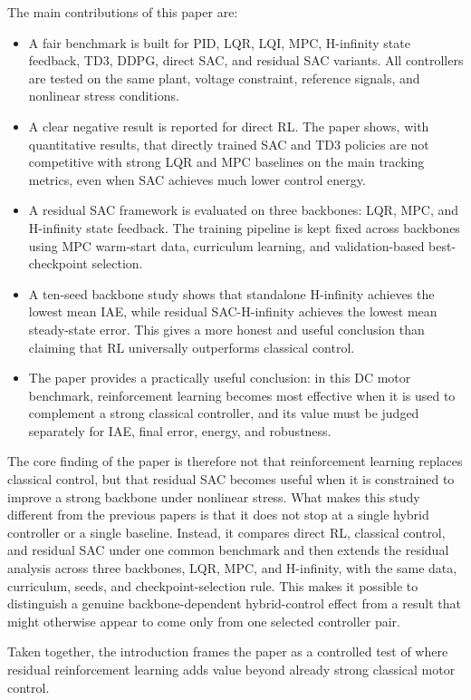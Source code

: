 \documentclass[conference]{IEEEtran}
\begin{document}
The main contributions of this paper are:
\begin{itemize}
    \item A fair benchmark is built for PID, LQR, LQI, MPC, H-infinity state feedback, TD3, DDPG, direct SAC, and residual SAC variants. All controllers are tested on the same plant, voltage constraint, reference signals, and nonlinear stress conditions.
    \item A clear negative result is reported for direct RL. The paper shows, with quantitative results, that directly trained SAC and TD3 policies are not competitive with strong LQR and MPC baselines on the main tracking metrics, even when SAC achieves much lower control energy.
    \item A residual SAC framework is evaluated on three backbones: LQR, MPC, and H-infinity state feedback. The training pipeline is kept fixed across backbones using MPC warm-start data, curriculum learning, and validation-based best-checkpoint selection.
    \item A ten-seed backbone study shows that standalone H-infinity achieves the lowest mean IAE, while residual SAC-H-infinity achieves the lowest mean steady-state error. This gives a more honest and useful conclusion than claiming that RL universally outperforms classical control.
    \item The paper provides a practically useful conclusion: in this DC motor benchmark, reinforcement learning becomes most effective when it is used to complement a strong classical controller, and its value must be judged separately for IAE, final error, energy, and robustness.
\end{itemize}

The core finding of the paper is therefore not that reinforcement learning replaces classical control, but that residual SAC becomes useful when it is constrained to improve a strong backbone under nonlinear stress. What makes this study different from the previous papers is that it does not stop at a single hybrid controller or a single baseline. Instead, it compares direct RL, classical control, and residual SAC under one common benchmark and then extends the residual analysis across three backbones, LQR, MPC, and H-infinity, with the same data, curriculum, seeds, and checkpoint-selection rule. This makes it possible to distinguish a genuine backbone-dependent hybrid-control effect from a result that might otherwise appear to come only from one selected controller pair.

Taken together, the introduction frames the paper as a controlled test of where residual reinforcement learning adds value beyond already strong classical motor control.
\end{document}
